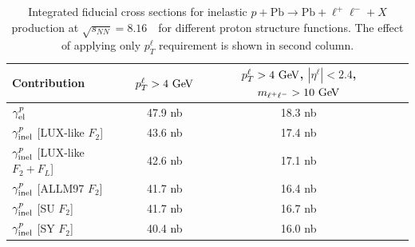 \begin{table}[t]
\centering
\begin{tabular}{|l|c|c|c|}
\hline
Contribution  &  $p_{T}^{\ell}>4~\text{Ge\kern -0.1em V}$ & $p_{T}^{\ell}>4~\text{Ge\kern -0.1em V}$, $|\eta^{\ell}|<2.4 $, $m_{\ell^+\ell^-}>10~\text{Ge\kern -0.1em V}$ \\
\hline
$\gamma^{p}_{\rm{el}}$   & 47.9 nb  & 18.3 nb \\
\hline
$\gamma^{p}_{\rm{inel}}$ [LUX-like  $F_2$]  & 43.6 nb  &  17.4 nb\\
\hline
$\gamma^{p}_{\rm{inel}}$ [LUX-like  $F_2+F_L$]  & 42.6 nb    & 17.1 nb\\
\hline    
$\gamma^{p}_{\rm{inel}}$ [ALLM97 $F_2$]  & 41.7 nb   &16.4 nb\\
\hline
$\gamma^{p}_{\rm{inel}}$ [SU $F_2$]  & 41.7  nb &16.7 nb\\
\hline 
$\gamma^{p}_{\rm{inel}}$ [SY $F_2$]  & 40.4  nb  &16.0 nb\\
\hline
\end{tabular}
\caption{Integrated fiducial cross sections for inelastic $p+\textrm{Pb}\rightarrow \textrm{Pb} + \ell^+\ell^- + X$ production at $\sqrt{s_{N N}} = 8.16$~\TeV\ for different proton structure functions. 
The effect of applying only $p_T^{\ell}$ requirement is shown in second column.
}
\label{tab:kt}
\end{table}



